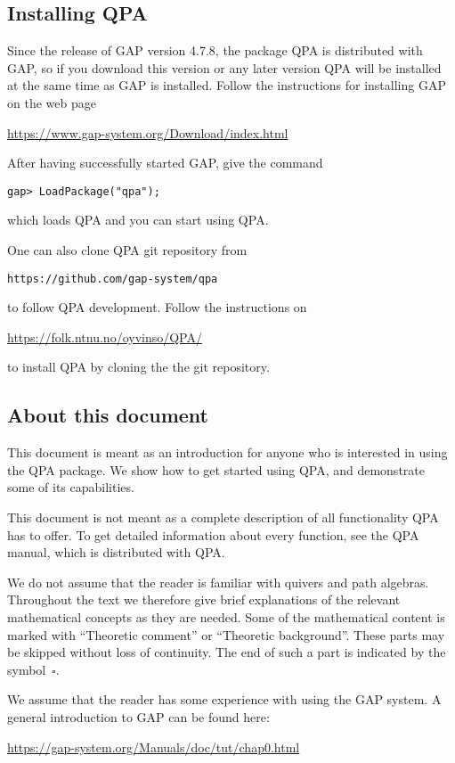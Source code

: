 \documentclass{amsart}
\theoremstyle{definition}
\theoremstyle{theoretic}
\begin{document}


\subsection{Installing QPA}
Since the release of GAP version 4.7.8, the package QPA is distributed
with GAP, so if you download this version or any later version QPA
will be installed at the same time as GAP is installed.  Follow
the instructions for installing GAP on the web page
\begin{center}
\url{https://www.gap-system.org/Download/index.html}
\end{center}
After having successfully started GAP, give the command
\begin{verbatim}
gap> LoadPackage("qpa");
\end{verbatim}
which loads QPA and you can start using QPA. 

One can also clone QPA git repository from
\begin{center}\texttt{https://github.com/gap-system/qpa}\end{center}
to follow QPA development. Follow the instructions on 
\begin{center}
\url{https://folk.ntnu.no/oyvinso/QPA/}
\end{center}
to install QPA by cloning the the git repository. 

\subsection{About this document}

This document is meant as an introduction for anyone who is interested
in using the QPA package.  We show how to get started using QPA, and
demonstrate some of its capabilities.

This document is not meant as a complete description of all
functionality QPA has to offer.  To get detailed information about
every function, see the QPA manual, which is distributed with QPA.

We do not assume that the reader is familiar with quivers and path
algebras.  Throughout the text we therefore give brief explanations of
the relevant mathematical concepts as they are needed.  Some of the
mathematical content is marked with ``Theoretic comment'' or
``Theoretic background''.  These parts may be skipped without loss of
continuity.  The end of such a part is indicated by the
symbol~$\square$.

We assume that the reader has some experience with using the GAP
system.  A general introduction to GAP can be found here:
\begin{center}
\url{https://gap-system.org/Manuals/doc/tut/chap0.html}
\end{center}
\end{document}
